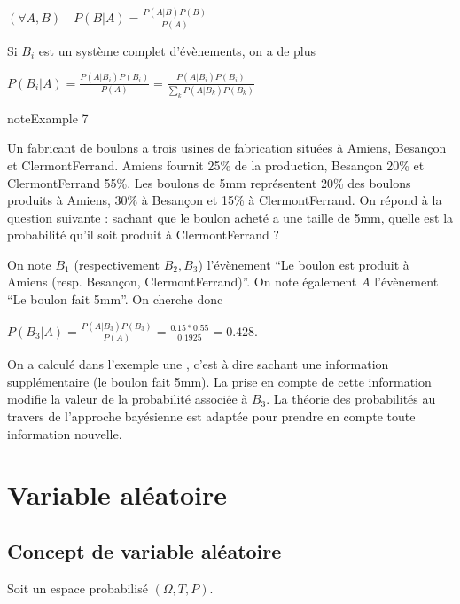 \documentclass[letterpaper,10pt,english]{jupyterBook}
\begin{document}
\sphinxAtStartPar
\((\forall A,B)\quad P(B|A)=\frac{P(A|B)P(B)}{P(A)}\)

\sphinxAtStartPar
Si \(B_i\) est un système complet d’évènements, on a de plus

\sphinxAtStartPar
\(P(B_i|A)= \frac{P(A|B_i)P(B_i)}{P(A)} = \frac{P(A|B_i)P(B_i)}{\displaystyle\sum_k P(A|B_k)P(B_k)}\)
\label{Rappels:example-17}
\begin{sphinxadmonition}{note}{Example 7}



\sphinxAtStartPar
Un fabricant de boulons a trois usines de fabrication situées à Amiens, Besançon et Clermont\sphinxhyphen{}Ferrand. Amiens fournit 25\% de la production, Besançon 20\% et Clermont\sphinxhyphen{}Ferrand 55\%. Les boulons de 5mm représentent 20\% des boulons produits à Amiens, 30\% à Besançon et 15\% à Clermont\sphinxhyphen{}Ferrand. On répond à la question suivante : sachant que le boulon acheté a une taille de 5mm, quelle est la probabilité qu’il soit produit à Clermont\sphinxhyphen{}Ferrand ?

\sphinxAtStartPar
On note \(B_1\) (respectivement \(B_2,B_3\)) l’évènement “Le boulon est produit à Amiens (resp. Besançon, Clermont\sphinxhyphen{}Ferrand)”. On note également \(A\) l’évènement “Le boulon fait 5mm”. On cherche donc

\sphinxAtStartPar
\(P(B_3|A) = \frac{P(A|B_3)P(B_3)}{P(A)}= \frac{0.15*0.55}{0.1925}=0.428\).
\end{sphinxadmonition}

\sphinxAtStartPar
On a calculé dans l’exemple une , c’est à dire sachant une information supplémentaire (le boulon fait 5mm). La prise en compte de cette information modifie la valeur de la probabilité associée à \(B_3\). La théorie des probabilités au travers de l’approche bayésienne est adaptée pour prendre en compte toute information nouvelle.


\section{Variable aléatoire}
\label{\detokenize{Rappels:variable-aleatoire}}

\subsection{Concept de variable aléatoire}
\label{\detokenize{Rappels:concept-de-variable-aleatoire}}
\sphinxAtStartPar
Soit un espace probabilisé \((\Omega, T,P)\).
\end{document}
